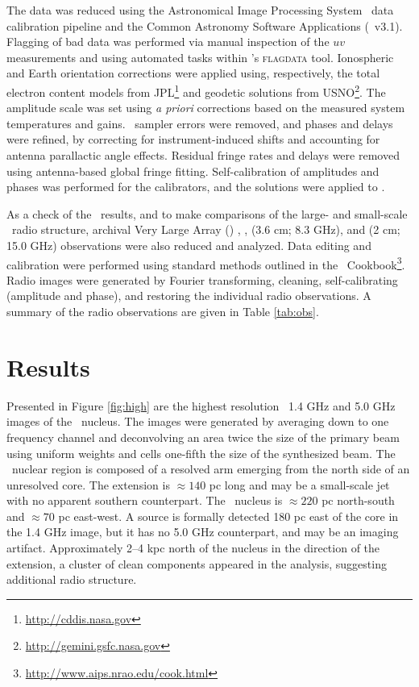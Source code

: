 \documentclass[11pt, preprint]{aastex}
\begin{document}
The data was reduced using the Astronomical Image Processing System
\vlba\ data calibration pipeline
\citep[\aips\ v31DEC11;][]{2005ASPC..340..613S} and the Common
Astronomy Software Applications (\casa\ v3.1). Flagging of bad data
was performed via manual inspection of the $uv$ measurements and using
automated tasks within \casa's {\textsc{flagdata}} tool. Ionospheric
and Earth orientation corrections were applied using, respectively,
the total electron content models from
JPL\footnote{\url{http://cddis.nasa.gov}} and geodetic solutions from
USNO\footnote{\url{http://gemini.gsfc.nasa.gov}}. The amplitude scale
was set using {\it{a priori}} corrections based on the measured system
temperatures and gains. \vlba\ sampler errors were removed, and phases
and delays were refined, by correcting for instrument-induced shifts
and accounting for antenna parallactic angle effects. Residual fringe
rates and delays were removed using antenna-based global fringe
fitting. Self-calibration of amplitudes and phases was performed for
the calibrators, and the solutions were applied to \irs.

As a check of the \vlba\ results, and to make comparisons of the
large- and small-scale \irs\ radio structure, archival Very Large
Array (\vla) ,
,
 (3.6 cm; 8.3 GHz), and
 (2 cm; 15.0 GHz) observations
were also reduced and analyzed. Data editing and calibration were
performed using standard methods outlined in the
\aips\ Cookbook\footnote{\url{http://www.aips.nrao.edu/cook.html}}. Radio
images were generated by Fourier transforming, cleaning,
self-calibrating (amplitude and phase), and restoring the individual
radio observations. A summary of the radio observations are given in
Table \ref{tab:obs}.

\section{Results}
\label{sec:res}

Presented in Figure \ref{fig:high} are the highest resolution
\vlba\ 1.4 GHz and 5.0 GHz images of the \irs\ nucleus. The images
were generated by averaging down to one frequency channel and
deconvolving an area twice the size of the primary beam using uniform
weights and cells one-fifth the size of the synthesized beam. The
\irs\ nuclear region is composed of a resolved arm emerging from the
north side of an unresolved core. The extension is $\approx 140$ pc
long and may be a small-scale jet with no apparent southern
counterpart. The \irs\ nucleus is $\approx 220$ pc north-south and
$\approx 70$ pc east-west. A source is formally detected 180 pc east
of the core in the 1.4 GHz image, but it has no 5.0 GHz counterpart,
and may be an imaging artifact. Approximately 2--4 kpc north of the
nucleus in the direction of the extension, a cluster of clean
components appeared in the analysis, suggesting additional radio
structure.
\end{document}
